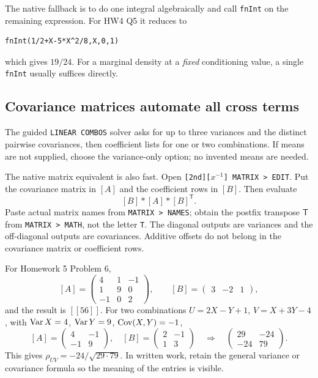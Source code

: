 The native fallback is to do one integral algebraically and call \texttt{fnInt} on the remaining expression. For HW4 Q5 it reduces to
\begin{verbatim}
fnInt(1/2+X-5*X^2/8,X,0,1)
\end{verbatim}
which gives $19/24$. For a marginal density at a \emph{fixed} conditioning value, a single \texttt{fnInt} usually suffices directly.

\subsection{Covariance matrices automate all cross terms}
The guided \texttt{LINEAR COMBOS} solver asks for up to three variances and the distinct pairwise covariances, then coefficient lists for one or two combinations. If means are not supplied, choose the variance-only option; no invented means are needed.

The native matrix equivalent is also fast. Open \texttt{[2nd][}$x^{-1}$\texttt{] MATRIX > EDIT}. Put the covariance matrix in $[A]$ and the coefficient rows in $[B]$. Then evaluate
\[
[B]*[A]*[B]^{\mathsf T}.
\]
Paste actual matrix names from \texttt{MATRIX > NAMES}; obtain the postfix transpose $\mathsf T$ from \texttt{MATRIX > MATH}, not the letter \texttt{T}. The diagonal outputs are variances and the off-diagonal outputs are covariances. Additive offsets do not belong in the covariance matrix or coefficient rows.

For Homework 5 Problem 6,
\[
[A]=\begin{pmatrix}4&1&-1\\1&9&0\\-1&0&2\end{pmatrix},\qquad
[B]=\begin{pmatrix}3&-2&1\end{pmatrix},
\]
and the result is $[[56]]$. For two combinations $U=2X-Y+1$, $V=X+3Y-4$, with $\operatorname{Var} X=4$, $\operatorname{Var} Y=9$, $\operatorname{Cov}(X,Y)=-1$,
\[
[A]=\begin{pmatrix}4&-1\\-1&9\end{pmatrix},\quad
[B]=\begin{pmatrix}2&-1\\1&3\end{pmatrix}
\quad\Longrightarrow\quad
\begin{pmatrix}29&-24\\-24&79\end{pmatrix}.
\]
This gives $\rho_{UV}=-24/\sqrt{29\cdot79}$. In written work, retain the general variance or covariance formula so the meaning of the entries is visible.

